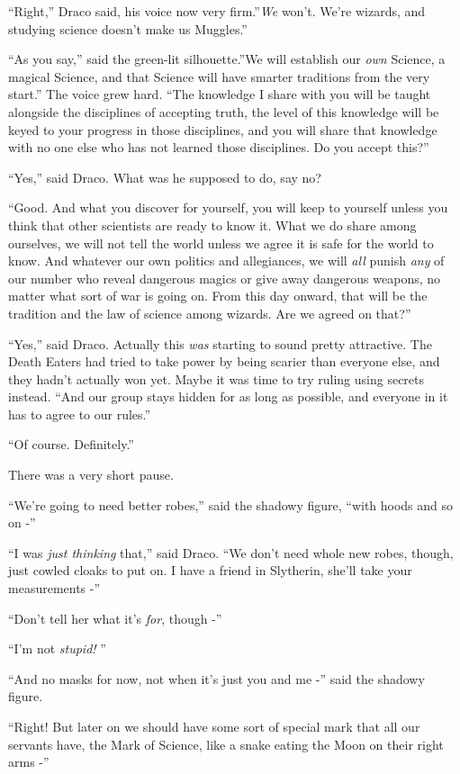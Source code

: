 ``Right,'' Draco said, his voice now very firm.''\emph{We} won't. We're
wizards, and studying science doesn't make us Muggles.''

``As you say,'' said the green-lit silhouette.''We will establish our
\emph{own} Science, a magical Science, and that Science will have
smarter traditions from the very start.'' The voice grew hard. ``The
knowledge I share with you will be taught alongside the disciplines of
accepting truth, the level of this knowledge will be keyed to your
progress in those disciplines, and you will share that knowledge with no
one else who has not learned those disciplines. Do you accept this?''

``Yes,'' said Draco. What was he supposed to do, say no?

``Good. And what you discover for yourself, you will keep to yourself
unless you think that other scientists are ready to know it. What we do
share among ourselves, we will not tell the world unless we agree it is
safe for the world to know. And whatever our own politics and
allegiances, we will \emph{all} punish \emph{any} of our number who
reveal dangerous magics or give away dangerous weapons, no matter what
sort of war is going on. From this day onward, that will be the
tradition and the law of science among wizards. Are we agreed on that?''

``Yes,'' said Draco. Actually this \emph{was} starting to sound pretty
attractive. The Death Eaters had tried to take power by being scarier
than everyone else, and they hadn't actually won yet. Maybe it was time
to try ruling using secrets instead. ``And our group stays hidden for as
long as possible, and everyone in it has to agree to our rules.''

``Of course. Definitely.''

There was a very short pause.

``We're going to need better robes,'' said the shadowy figure, ``with
hoods and so on -''

``I was \emph{just thinking} that,'' said Draco. ``We don't need whole
new robes, though, just cowled cloaks to put on. I have a friend in
Slytherin, she'll take your measurements -''

``Don't tell her what it's \emph{for}, though -''

``I'm not \emph{stupid!} ''

``And no masks for now, not when it's just you and me -'' said the
shadowy figure.

``Right! But later on we should have some sort of special mark that all
our servants have, the Mark of Science, like a snake eating the Moon on
their right arms -''


